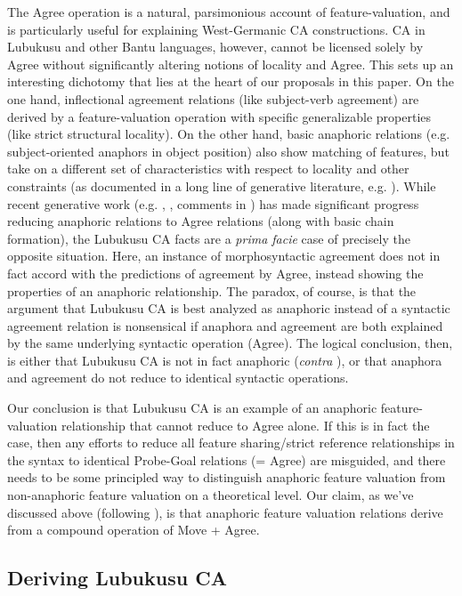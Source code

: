 The Agree operation is a natural, parsimonious account of feature-valuation, and is particularly useful for explaining West-Germanic CA constructions. CA in Lubukusu and other Bantu languages, however, cannot be licensed solely by Agree without significantly altering notions of locality and Agree.  
This sets up an interesting dichotomy that lies at the heart of our proposals in this paper. On the one hand, inflectional agreement relations (like subject-verb agreement) are derived by a feature-valuation operation with specific generalizable properties (like strict structural locality). On the other hand, basic anaphoric relations (e.g. subject-oriented anaphors in object position) also show matching of features, but take on a different set of characteristics with respect to locality and other constraints (as documented in a long line of generative literature, e.g. \citealt{Chomsky:1981,Safir:2004,Reuland:2011}). While recent generative work (e.g. \citealt{Reuland:2011}, \citealt{Hicks:2009}, comments in \citealt{Wurmbrand:2011}) has made significant progress reducing anaphoric relations to Agree relations (along with basic chain formation), the Lubukusu CA facts are a \textit{prima facie} case of precisely the opposite situation. Here, an instance of morphosyntactic agreement does not in fact accord with the predictions of agreement by Agree, instead showing the properties of an anaphoric relationship. The paradox, of course, is that the argument that Lubukusu CA is best analyzed as anaphoric instead of a syntactic agreement relation is nonsensical if anaphora and agreement are both explained by the same underlying syntactic operation (Agree). The logical conclusion, then, is either that Lubukusu CA is not in fact anaphoric (\textit{contra} \citealt{Diercks:2013}), or that anaphora and agreement do not reduce to identical syntactic operations.

Our conclusion is that Lubukusu CA is an example of an anaphoric feature-valuation relationship that cannot reduce to Agree alone. If this is in fact the case, then any efforts to reduce all feature sharing/strict reference relationships in the syntax to identical Probe-Goal relations (= Agree) are misguided, and there needs to be some principled way to distinguish anaphoric feature valuation from non-anaphoric feature valuation on a theoretical level. Our claim, as we’ve discussed above (following \citealt{Rooryck:2011}), is that anaphoric feature valuation relations derive from a compound operation of Move + Agree.

\subsection{Deriving Lubukusu CA}

